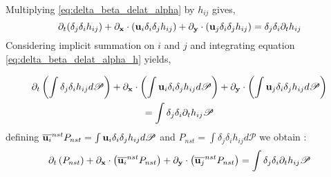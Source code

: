 Multiplying \ref{eq:delta_beta_delat_alpha} by $h_{ij}$ gives, 
\begin{equation}
    \partial_t (\delta_j\delta_i h_{ij}) + \partial_\textbf{x} \cdot (\textbf{u}_i \delta_i\delta_j h_{ij}) + \partial_\textbf{y} \cdot (\textbf{u}_j \delta_i\delta_j h_{ij}) = \delta_j\delta_i\partial_t h_{ij}
    \label{eq:delta_beta_delat_alpha_h}
\end{equation}
Considering implicit summation on $i$ and $j$ and integrating equation \ref{eq:delta_beta_delat_alpha_h}  yields, 

\begin{multline}
    \partial_t \left(\int \delta_j\delta_i h_{ij} d\mathscr{P} \right) 
    + \partial_\textbf{x} \cdot \left(\int\textbf{u}_i \delta_i\delta_j h_{ij} d\mathscr{P} \right) 
    + \partial_\textbf{y} \cdot \left( \int \textbf{u}_j \delta_i\delta_j h_{ij} d\mathscr{P} \right) 
    \\=\int \delta_j\delta_i\partial_t h_{ij} \mathscr{P}
\end{multline}
defining $\overline{\textbf{u}_i}^{nst} P_{nst}= \int\textbf{u}_i \delta_i\delta_j h_{ij} d\mathscr{P} $ and $P_{nst} = \int \delta_j\delta_i h_{ij} d\mathscr{P} $ we obtain :
\begin{equation}
    \partial_t \left(P_{nst} \right) 
    + \partial_\textbf{x} \cdot \left(\overline{\textbf{u}_i}^{nst} P_{nst}\right) 
    + \partial_\textbf{y} \cdot \left( \overline{\textbf{u}_j}^{nst} P_{nst} \right) 
    =\int \delta_j\delta_i\partial_t h_{ij} \mathscr{P}
\end{equation}



